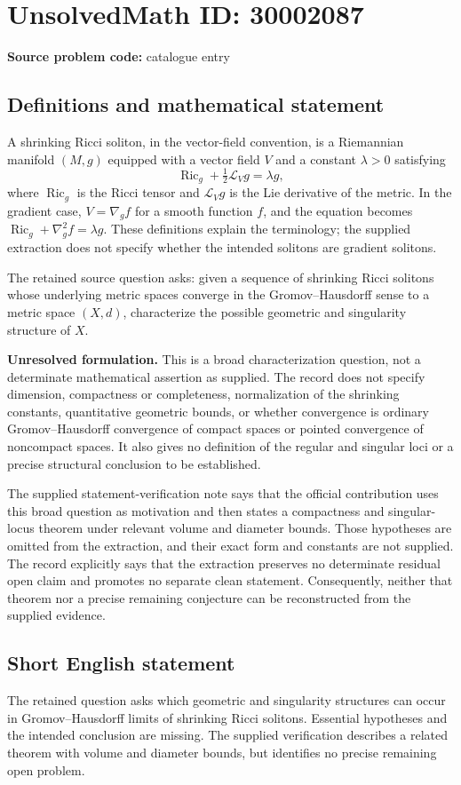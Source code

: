 \documentclass[11pt]{article}
\begin{document}
\section*{UnsolvedMath ID: 30002087}
\textbf{Source problem code:} catalogue entry
\subsection{Definitions and mathematical statement}
A shrinking Ricci soliton, in the vector-field convention, is a Riemannian manifold \((M,g)\) equipped with a vector field \(V\) and a constant \(\lambda>0\) satisfying
\[
\operatorname{Ric}_g+\tfrac12\mathcal L_Vg=\lambda g,
\]
where \(\operatorname{Ric}_g\) is the Ricci tensor and \(\mathcal L_Vg\) is the Lie derivative of the metric. In the gradient case, \(V=\nabla_g f\) for a smooth function \(f\), and the equation becomes \(\operatorname{Ric}_g+\nabla_g^2f=\lambda g\). These definitions explain the terminology; the supplied extraction does not specify whether the intended solitons are gradient solitons.

The retained source question asks: given a sequence of shrinking Ricci solitons whose underlying metric spaces converge in the Gromov--Hausdorff sense to a metric space \((X,d)\), characterize the possible geometric and singularity structure of \(X\).

\textbf{Unresolved formulation.} This is a broad characterization question, not a determinate mathematical assertion as supplied. The record does not specify dimension, compactness or completeness, normalization of the shrinking constants, quantitative geometric bounds, or whether convergence is ordinary Gromov--Hausdorff convergence of compact spaces or pointed convergence of noncompact spaces. It also gives no definition of the regular and singular loci or a precise structural conclusion to be established.

The supplied statement-verification note says that the official contribution uses this broad question as motivation and then states a compactness and singular-locus theorem under relevant volume and diameter bounds. Those hypotheses are omitted from the extraction, and their exact form and constants are not supplied. The record explicitly says that the extraction preserves no determinate residual open claim and promotes no separate clean statement. Consequently, neither that theorem nor a precise remaining conjecture can be reconstructed from the supplied evidence.
\subsection{Short English statement}
The retained question asks which geometric and singularity structures can occur in Gromov--Hausdorff limits of shrinking Ricci solitons. Essential hypotheses and the intended conclusion are missing. The supplied verification describes a related theorem with volume and diameter bounds, but identifies no precise remaining open problem.
\end{document}
